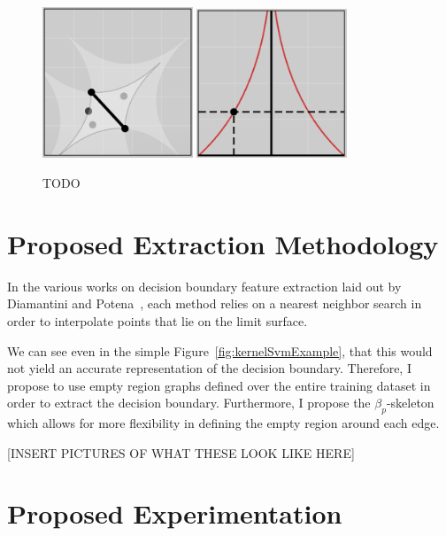 \documentclass[12pt]{article}
\begin{document}
\begin{figure}[!ht]
  \centering
  \includegraphics[width=0.4\textwidth]{figs/chap6/bskeleton}
  \includegraphics[width=0.4\textwidth]{figs/chap6/bskeletonParameter}
  \caption[Example edge test where $\beta=.4$ and $p=0.5$. The space can be
  parameterized by the edge.]{TODO}
  \label{fig:ergParameterization}
\end{figure}

\section{Proposed Extraction Methodology}

In the various works on decision boundary feature extraction laid out by
Diamantini and Potena~\cite{DiamantiniPotena2007}, each method relies on a
nearest neighbor search in order to interpolate points that lie on the limit
surface.

We can see even in the simple Figure~\ref{fig:kernelSvmExample}, that this would
not yield an accurate representation of the decision boundary.
%
Therefore, I propose to use empty region graphs defined over the entire training
dataset in order to extract the decision boundary.
%
Furthermore, I propose the $\beta_p$-skeleton which allows for more flexibility
in defining the empty region around each edge.

[INSERT PICTURES OF WHAT THESE LOOK LIKE HERE]

\section{Proposed Experimentation}
\end{document}
